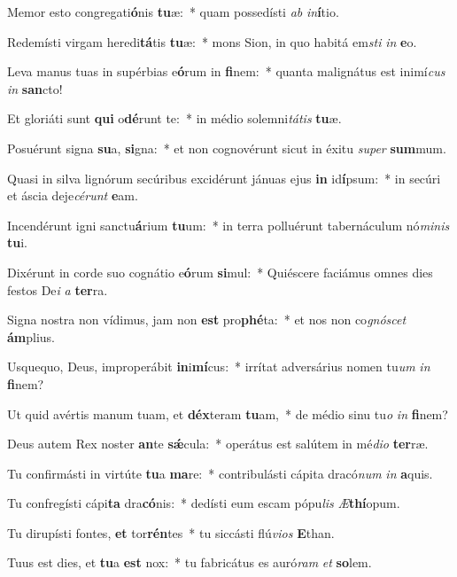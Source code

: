 \item Memor esto congregati\textbf{ó}nis \textbf{tu}æ:~* quam possedísti \textit{ab} \textit{in}\textbf{í}tio.
\item Redemísti virgam heredi\textbf{tá}tis \textbf{tu}æ:~* mons Sion, in quo habitá em\textit{sti} \textit{in} \textbf{e}o.
\item Leva manus tuas in supérbias e\textbf{ó}rum in \textbf{fi}nem:~* quanta malignátus est inimí\textit{cus} \textit{in} \textbf{san}cto!
\item Et gloriáti sunt \textbf{qui} o\textbf{dé}runt te:~* in médio solemni\textit{tátis} \textbf{tu}æ.
\item Posuérunt signa \textbf{su}a, \textbf{si}gna:~* et non cognovérunt sicut in éxitu \textit{super} \textbf{sum}mum.
\item Quasi in silva lignórum secúribus excidérunt jánuas ejus \textbf{in} id\textbf{í}psum:~* in secúri et áscia deje\textit{cérunt} \textbf{e}am.
\item Incendérunt igni sanctu\textbf{á}rium \textbf{tu}um:~* in terra polluérunt tabernáculum nó\textit{minis} \textbf{tu}i.
\item Dixérunt in corde suo cognátio e\textbf{ó}rum \textbf{si}mul:~* Quiéscere faciámus omnes dies festos De\textit{i} \textit{a} \textbf{ter}ra.
\item Signa nostra non vídimus, jam non \textbf{est} pro\textbf{phé}ta:~* et nos non co\textit{gnóscet} \textbf{ám}plius.
\item Usquequo, Deus, improperábit \textbf{in}i\textbf{mí}cus:~* irrítat adversárius nomen tu\textit{um} \textit{in} \textbf{fi}nem?
\item Ut quid avértis manum tuam, et \textbf{déx}teram \textbf{tu}am,~* de médio sinu tu\textit{o} \textit{in} \textbf{fi}nem?
\item Deus autem Rex noster \textbf{an}te \textbf{sǽ}cula:~* operátus est salútem in mé\textit{dio} \textbf{ter}ræ.
\item Tu confirmásti in virtúte \textbf{tu}a \textbf{ma}re:~* contribulásti cápita dracó\textit{num} \textit{in} \textbf{a}quis.
\item Tu confregísti cápi\textbf{ta} dra\textbf{có}nis:~* dedísti eum escam pópu\textit{lis} \textit{Æ}\textbf{thí}opum.
\item Tu dirupísti fontes, \textbf{et} tor\textbf{rén}tes~* tu siccásti flú\textit{vios} \textbf{E}than.
\item Tuus est dies, et \textbf{tu}a \textbf{est} nox:~* tu fabricátus es auró\textit{ram} \textit{et} \textbf{so}lem.
